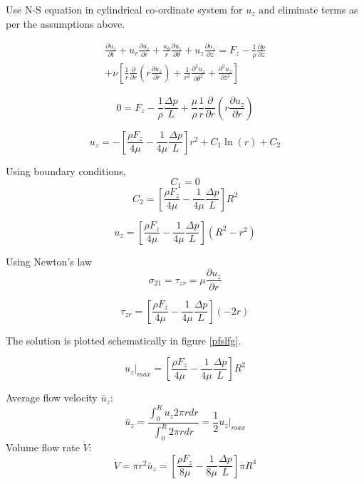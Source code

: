 Use N-S equation in cylindrical co-ordinate system for $u_z$ and eliminate terms as per the assumptions above.

\begin{align}
\frac{\partial u_z}{\partial t} + u_r \frac{\partial u_z}{\partial r} + \frac{u_\theta}{r} \frac{\partial u_z}{\partial \theta} + u_z \frac{\partial u_z}{\partial z} = F_z-\frac{1}{\rho}\frac{\partial p}{\partial z} \nonumber \\
+ \nu \left[ \frac{1}{r} \frac{\partial}{\partial r}\left( r \frac{\partial u_z}{\partial r} \right) + \frac{1}{r^2}\frac{\partial^2 u_z}{\partial \theta^2} + \frac{\partial^2 u_z}{\partial z^2} \right] 
\end{align}

\begin{equation*}
0 = F_z-\frac{1}{\rho}\frac{\Delta p}{L} + \frac{\mu}{\rho} \frac{1}{r} \frac{\partial}{\partial r}\left( r \frac{\partial u_z}{\partial r} \right)  
\end{equation*}

\begin{equation*}
u_z  = -\left[ \frac{\rho F_z}{4 \mu}-\frac{1}{4\mu}\frac{\Delta p}{L} \right] r^2 + C_1 \ln(r) + C_2
\end{equation*}

Using boundary conditions,
$$C_1 = 0$$
\begin{equation*}
C_2  = \left[ \frac{\rho F_z}{4 \mu}-\frac{1}{4\mu}\frac{\Delta p}{L} \right] R^2 
\end{equation*}

\begin{equation*}
u_z = \left[ \frac{\rho F_z}{4 \mu}-\frac{1}{4\mu}\frac{\Delta p}{L} \right] (R^2 - r^2)
\end{equation*}

Using Newton's law $$\sigma_{21} = \tau_{zr} = \mu \frac{\partial u_z}{\partial r}$$

$$\tau_{zr} = \left[ \frac{\rho F_z}{4 \mu}-\frac{1}{4\mu}\frac{\Delta p}{L} \right] (-2r) $$

The solution is plotted schematically in figure \ref{pfslfg}.

\begin{equation*}
u_z|_{max} = \left[ \frac{\rho F_z}{4 \mu}-\frac{1}{4\mu}\frac{\Delta p}{L} \right] R^2
\end{equation*}

Average flow velocity $\bar{u}_z$:
$$ \bar{u}_z = \frac{\int_0^R{u_z 2\pi r dr}}{\int_0^R{2\pi r dr}} = \frac{1}{2} u_z|_{max}$$
Volume flow rate $\dot{V}$:
$$ \dot{V} = \pi r^2 \bar{u}_z = \left[ \frac{\rho F_z}{8 \mu}-\frac{1}{8\mu}\frac{\Delta p}{L} \right] \pi R^4 $$

